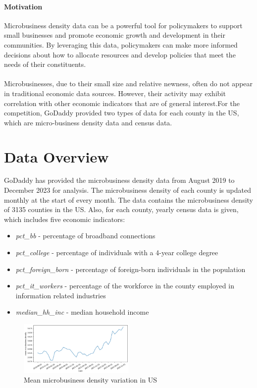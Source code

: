 \documentclass{article}
\begin{document}
\paragraph{Motivation} Microbusiness density data can be a powerful tool for policymakers to support small businesses and promote economic growth and development in their communities. By leveraging this data, policymakers can make more informed decisions about how to allocate resources and develop policies that meet the needs of their constituents.

\paragraph{} Microbusinesses, due to their small size and relative newness, often do not appear in traditional economic data sources. However, their activity may exhibit correlation with other economic indicators that are of general interest.For the competition, GoDaddy provided two types of data for each county in the US, which are micro-business density data and census data. 

\vspace{2em}
\section{\centering Data Overview}
\vspace{1em}
GoDaddy has provided the microbusiness density data from August 2019 to December 2023 for analysis. The microbusiness density of each county is updated monthly at the start of every month. The data contains the microbusiness density of 3135 counties in the US. Also, for each county, yearly census data is given, which includes five economic indicators: 

\begin{itemize}
\item \textit{pct\_bb} -  percentage of broadband connections
\item \textit{pct\_college} - percentage of individuals with a 4-year college degree 
\item \textit{pct\_foreign\_born} - percentage of foreign-born individuals in the population
\item \textit{pct\_it\_workers} - percentage of the workforce in the county employed in information related industries
\item \textit{median\_hh\_inc} - median household income
\end{itemize}

\begin{figure}[ht]
	\centering
	\includegraphics[width=0.5\textwidth]{images/mbd_gif/time_variation}
	\caption{Mean microbusiness density variation in US}
	\label{fig:fig1}
\end{figure}
\end{document}

